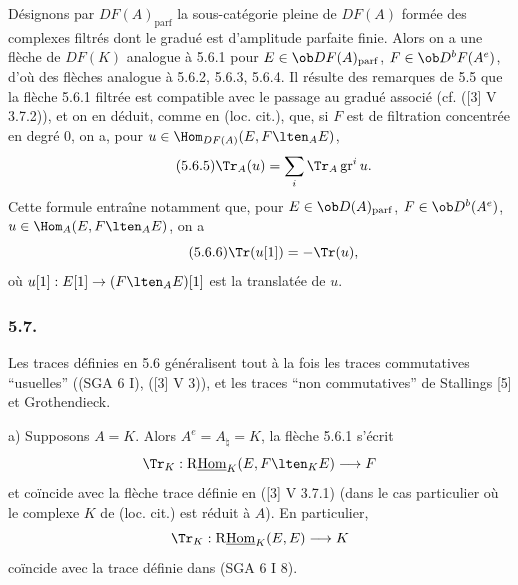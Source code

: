 Désignons par $DF(A)_{\mathrm{parf}}$ la sous-catégorie pleine de $DF(A)$ formée des complexes filtrés dont le gradué est d'amplitude parfaite finie. Alors on a une flèche de $DF(K)$ analogue à 5.6.1 pour $E\in\ob DF(A)_{\mathrm{parf}}$, $F\in\ob D^bF(A^e)$, d'où des flèches analogue à 5.6.2, 5.6.3, 5.6.4. Il résulte des remarques de 5.5 que la flèche 5.6.1 filtrée est compatible avec le passage au gradué associé (cf. ([3] V 3.7.2)), et on en déduit, comme en (loc. cit.), que, si $F$ est de filtration concentrée en degré $0$, on a, pour $u\in\Hom_{DF(A)}(E,F\lten_AE)$,
\begin{equation}\tag{5.6.5}
\Tr_A(u)=\sum_i\Tr_A\operatorname{gr}^i u.
\end{equation}
Cette formule entraîne notamment que, pour $E\in\ob D(A)_{\mathrm{parf}}$, $F\in\ob D^b(A^e)$, $u\in\Hom_A(E,F\lten_AE)$, on a
\begin{equation}\tag{5.6.6}
\Tr(u[1])=-\Tr(u),
\end{equation}
où $u[1]:E[1]\to(F\lten_AE)[1]$ est la translatée de $u$.

\subsubsection*{5.7.}

Les traces définies en 5.6 généralisent tout à la fois les traces commutatives ``usuelles'' ((SGA 6 I), ([3] V 3)), et les traces ``non commutatives'' de Stallings [5] et Grothendieck.

a) Supposons $A=K$. Alors $A^e=A_\natural=K$, la flèche 5.6.1 s'écrit
\[
\Tr_K:\mathrm{R}\underline{\mathrm{Hom}}_K(E,F\lten_KE)\longrightarrow F
\]
et
coïncide avec la flèche trace définie en ([3] V 3.7.1) (dans le cas particulier où le complexe $K$ de (loc. cit.) est réduit à $A$). En particulier,
\[
\Tr_K:\mathrm{R}\underline{\mathrm{Hom}}_K(E,E)\longrightarrow K
\]
coïncide avec la trace définie dans (SGA 6 I 8).

